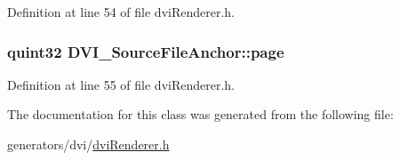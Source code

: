 Definition at line 54 of file dvi\+Renderer.\+h.

\hypertarget{classDVI__SourceFileAnchor_a0e6c40abda8f0a8c4076bc0dee5c6691}{
\subsubsection[{page}]{\setlength{\rightskip}{0pt plus 5cm}quint32 D\+V\+I\+\_\+\+Source\+File\+Anchor\+::page}}\label{classDVI__SourceFileAnchor_a0e6c40abda8f0a8c4076bc0dee5c6691}


Definition at line 55 of file dvi\+Renderer.\+h.



The documentation for this class was generated from the following file\+:\begin{DoxyCompactItemize}
\item 
generators/dvi/\hyperlink{dviRenderer_8h}{dvi\+Renderer.\+h}\end{DoxyCompactItemize}
